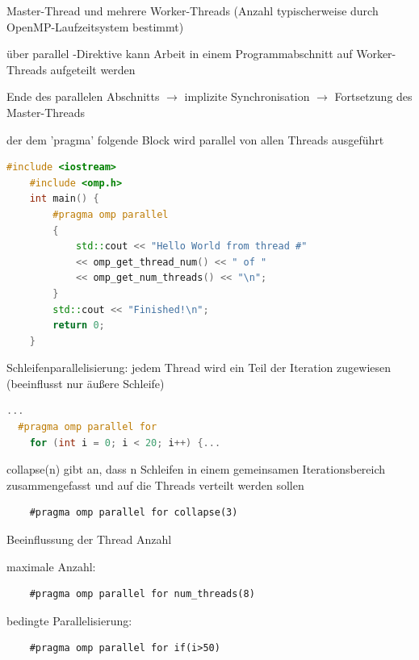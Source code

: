 \documentclass[10pt]{article}
\begin{document}
  \begin{itemize*}
    \item Master-Thread und mehrere Worker-Threads (Anzahl typischerweise durch OpenMP-Laufzeitsystem bestimmt)
    \item über parallel -Direktive kann Arbeit in einem Programmabschnitt auf Worker-Threads aufgeteilt werden
    \item Ende des parallelen Abschnitts $\rightarrow$ implizite Synchronisation $\rightarrow$ Fortsetzung des Master-Threads
    \item der dem 'pragma' folgende Block wird parallel von allen Threads ausgeführt
    \begin{lstlisting}[language=C++]
    #include <iostream>
    #include <omp.h>
    int main() {
        #pragma omp parallel
        {
            std::cout << "Hello World from thread #"
            << omp_get_thread_num() << " of "
            << omp_get_num_threads() << "\n";
        }
        std::cout << "Finished!\n";
        return 0;
    }
    \end{lstlisting}
    \item Schleifenparallelisierung: jedem Thread wird ein Teil der Iteration zugewiesen (beeinflusst nur äußere Schleife)
    \begin{lstlisting}[language=C++]
  ...
  #pragma omp parallel for
    for (int i = 0; i < 20; i++) {...
  \end{lstlisting}
    \begin{itemize*}
      \item collapse(n) gibt an, dass n Schleifen in einem gemeinsamen Iterationsbereich zusammengefasst und auf die Threads verteilt werden sollen
      \begin{lstlisting}
    #pragma omp parallel for collapse(3)
    \end{lstlisting}
    \end{itemize*}
    \item Beeinflussung der Thread Anzahl
    \begin{itemize*}
      \item maximale Anzahl:
      \begin{lstlisting}
    #pragma omp parallel for num_threads(8)
    \end{lstlisting}
      \item bedingte Parallelisierung:
      \begin{lstlisting}
    #pragma omp parallel for if(i>50)
    \end{lstlisting}
    \end{itemize*}

\end{itemize*}
\end{document}
